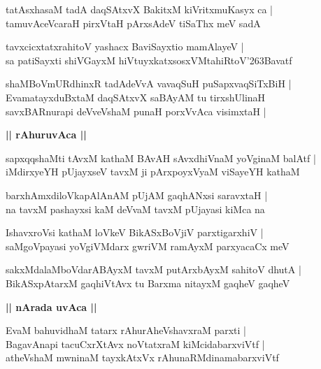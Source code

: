 \documentclass[twoside,12pt,openright]{book}
\def\S{\char'263}
\newcounter{shloka}[chapter]
\def\uvaca#1{\centerline{{\large\textbf{#1}}}}
\begin{document}
\begin{shloka}%
tatAsxhasaM tadA daqSAtxvX BakitxM kiVritxmuKasyx ca |\\
tamuvAceVcaraH pirxVtaH pArxsAdeV tiSaThx meV sadA 
\end{shloka}

\begin{shloka}%
tavxcicxtatxrahitoV yashacx BaviSayxtio mamAlayeV |\\
sa patiSayxti shiVGayxM hiVtuyxkatxsosxVMtahiRtoV\S Bavatf
\end{shloka}

\begin{shloka}%
shaMBoVmURdhinxR tadAdeVvA vavaqSuH puSapxvaqSiTxBiH |\\
EvamatayxduBxtaM daqSAtxvX saBAyAM tu tirxshUlinaH \\
savxBARnurapi deVveVshaM punaH porxVvAca visimxtaH | 
\end{shloka}

\uvaca{|| rAhuruvAca ||}

\begin{shloka}%
sapxqqshaMti tAvxM kathaM BAvAH sAvxdhiVnaM yoVginaM balAtf |\\
iMdirxyeYH pUjayxseV tavxM ji pArxpoyxVyaM viSayeYH kathaM 
\end{shloka}

\begin{shloka}%
barxhAmxdiloVkapAlAnAM pUjAM gaqhANxsi saravxtaH |\\
na tavxM pashayxsi kaM deVvaM tavxM pUjayasi kiMca na 
\end{shloka}

\begin{shloka}%
IshavxroVsi kathaM loVkeV BikASxBoVjiV parxtigarxhiV |\\
saMgoVpayasi yoVgiVMdarx gwriVM ramAyxM parxyacaCx meV 
\end{shloka}

\begin{shloka}%
sakxMdalaMboVdarABAyxM tavxM putArxbAyxM sahitoV dhutA |\\
BikASxpAtarxM gaqhiVtAvx tu Barxma nitayxM gaqheV gaqheV
\end{shloka}

\uvaca{|| nArada uvAca ||}

\begin{shloka}%
EvaM bahuvidhaM tatarx rAhurAheVshavxraM parxti |\\
BagavAnapi tacuCxrXtAvx noVtatxraM kiMcidabarxviVtf |\\
atheVshaM mwninaM tayxkAtxVx rAhunaRMdinamabarxviVtf
\end{shloka}
\end{document}

